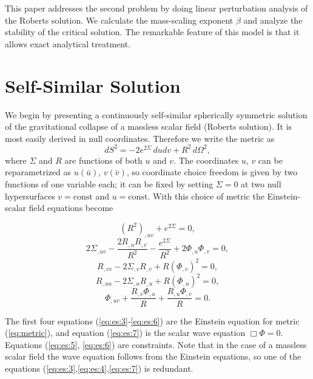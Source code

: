 This paper addresses the second problem by doing linear perturbation
analysis of the Roberts solution. We calculate the mass-scaling
exponent $\beta$ and analyze the stability of the critical solution.
The remarkable feature of this model is that it allows exact analytical
treatment.


\section{Self-Similar Solution} \label{sec:ss_soln}

We begin by presenting a continuously self-similar spherically
symmetric solution of the gravitational collapse of a massless scalar
field (Roberts solution). It is most easily derived in null
coordinates. Therefore we write the metric as
\begin{equation} \label{eq:metric}
  dS^2 = - 2e^{2\Sigma}\, du dv + R^2\, d\Omega^2,
\end{equation}
where $\Sigma$ and $R$ are functions of both $u$ and $v$. The
coordinates $u$, $v$ can be reparametrized as $u(\bar{u})$,
$v(\bar{v})$, so coordinate choice freedom is given by two functions of
one variable each; it can be fixed by setting $\Sigma=0$ at two null
hypersurfaces $v=\text{const}$ and $u=\text{const}$. With this choice
of metric the Einstein-scalar field equations become
\begin{mathletters} \label{eq:es}
\begin{equation} \label{eq:es:3}
  (R^2)_{,uv} + e^{2\Sigma} = 0,
\end{equation}
\begin{equation} \label{eq:es:4}
  2\Sigma_{,uv} - \frac{2R_{,u}R_{,v}}{R^2} -
    \frac{e^{2\Sigma}}{R^2} + 2 \Phi_{,u}\Phi_{,v} = 0,
\end{equation}
\begin{equation} \label{eq:es:5}
  R_{,vv} - 2\Sigma_{,v}R_{,v} + R (\Phi_{,v})^2 = 0,
\end{equation}
\begin{equation} \label{eq:es:6}
  R_{,uu} - 2\Sigma_{,u}R_{,u} + R (\Phi_{,u})^2 = 0,
\end{equation}
\begin{equation} \label{eq:es:7}
  \Phi_{,uv} + \frac{R_{,v}\Phi_{,u}}{R} + \frac{R_{,u}\Phi_{,v}}{R} = 0.
\end{equation}
\end{mathletters}
The first four equations (\ref{eq:es:3}-\ref{eq:es:6}) are the Einstein
equation for metric (\ref{eq:metric}), and equation (\ref{eq:es:7}) is
the scalar wave equation $\Box\Phi=0$. Equations (\ref{eq:es:5},%
\ref{eq:es:6}) are constraints. Note that in the case of a massless
scalar field the wave equation follows from the Einstein equations, so
one of the equations (\ref{eq:es:3},\ref{eq:es:4},\ref{eq:es:7}) is
redundant.

